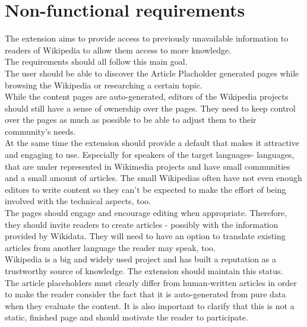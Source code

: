 \chapter{Non-functional requirements}

The extension aims to provide access to previously unavailable information to readers of Wikipedia to allow them access to more knowledge. \\
The requirements should all follow this main goal. \\
The user should be able to discover the Article Placholder generated pages while browsing the Wikipedia or researching a certain topic. \\
While the content pages are auto-generated, editors of the Wikipedia projects should still have a sense of ownership over the pages. They need to keep control over the pages as much as possible to be able to adjust them to their community's needs.  \\
At the same time the extension should provide a default that makes it attractive and engaging to use. Especially for speakers of the target languages- languages, that are under represented in Wikimedia projects and have small communities and a small amount of articles. The small Wikipedias often have not even enough editors to write content so they can't be expected to make the effort of being involved with the technical aspects, too.  \\
The pages should engage and encourage editing when appropriate. Therefore, they should invite readers to create articles - possibly with the information provided by Wikidata. They will need to have an option to translate existing articles from another language the reader may speak, too. \\
Wikipedia is a big and widely used project and has built a reputation as a trustworthy source of knowledge. The extension should maintain this status. \\
The article placeholders must clearly differ from human-written articles in order to make the reader consider the fact that it is auto-generated from pure data when they evaluate the content. It is also important to clarify that this is not a static, finished page and should motivate the reader to participate. \\